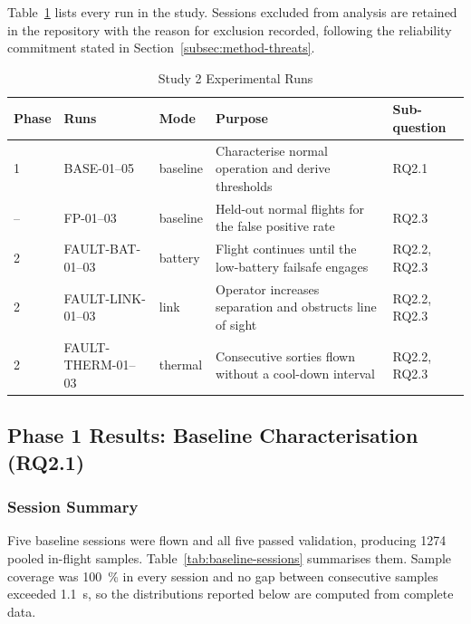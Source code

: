 Table~\ref{tab:rq2-runs} lists every run in the study. Sessions excluded from
analysis are retained in the repository with the reason for exclusion recorded,
following the reliability commitment stated in Section~\ref{subsec:method-threats}.

\begin{table}[htbp]
\centering
\caption{Study 2 Experimental Runs}
\label{tab:rq2-runs}
\small
\begin{tabular}{|l|l|l|p{5.0cm}|l|}
\hline
\textbf{Phase} & \textbf{Runs} & \textbf{Mode} & \textbf{Purpose} & \textbf{Sub-question} \\
\hline
1 & BASE-01--05 & baseline & Characterise normal operation and derive thresholds & RQ2.1 \\
\hline
-- & FP-01--03 & baseline & Held-out normal flights for the false positive rate & RQ2.3 \\
\hline
2 & FAULT-BAT-01--03 & battery & Flight continues until the low-battery failsafe engages & RQ2.2, RQ2.3 \\
\hline
2 & FAULT-LINK-01--03 & link & Operator increases separation and obstructs line of sight & RQ2.2, RQ2.3 \\
\hline
2 & FAULT-THERM-01--03 & thermal & Consecutive sorties flown without a cool-down interval & RQ2.2, RQ2.3 \\
\hline
\end{tabular}
\end{table}

\subsection{Phase 1 Results: Baseline Characterisation
(RQ2.1)}\label{sec:rq2-phase1}

\subsubsection{Session Summary}\label{sec:rq2-sessions}

Five baseline sessions were flown and all five passed validation, producing 1274
pooled in-flight samples. Table~\ref{tab:baseline-sessions} summarises them.
Sample coverage was \SI{100}{\percent} in every session and no gap between
consecutive samples exceeded \SI{1.1}{\second}, so the distributions reported
below are computed from complete data.

